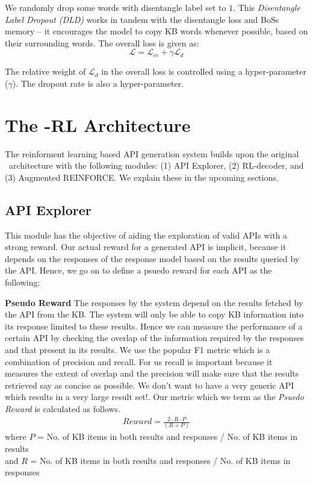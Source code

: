 We randomly drop some words with disentangle label set to $1$. This \textit{Disentangle Label Dropout (DLD)} works in tandem with the disentangle loss and {\sc BoSs} memory -- it encourages the model to copy KB words whenever possible, based on their surrounding words. The overall loss is given as:
\begin{equation}
\mathcal{L} = \mathcal{L}_{ce} + \gamma \mathcal{L}_{d}
\label{eqn:loss}
\end{equation}

The relative weight of $\mathcal{L}_{d}$ in the overall loss is controlled using a hyper-parameter ($\gamma$). The dropout rate is also a hyper-parameter.

\section{The \sys -RL Architecture}
The reinforment learning based API generation system builds upon the original \sys\ architecture with the following modules: (1) API Explorer, (2) RL-decoder, and (3) Augmented REINFORCE. We explain these in the upcoming sections.

\subsection{API Explorer}
This module has the objective of aiding the exploration of valid APIs with a strong reward. Our actual reward for a generated API is implicit, because it depends on the responses of the response model based on the results queried by the API. Hence, we go on to define a psuedo reward for each API as the following:

\noindent\textbf{Pseudo Reward}
\label{ssec:PsReward}
The responses by the system depend on the results fetched by the API from the KB. The system will only be able to copy KB information into its response limited to these results. Hence we can measure the performance of a certain API by checking the overlap of the information required by the responses and that present in its results. We use the popular F1 metric which is a combination of precision and recall. For us recall is important because it measures the extent of overlap and the precision will make sure that the results retrieved say as concise as possible. We don't want to have a very generic API which results in a very large result set!. Our metric which we term as the {\em Psuedo Reward} is calculated as follows.
\begin{gather}
Reward = \frac{2 \cdot R \cdot P}{(R + P)}
\end{gather}
where $P$ = No. of KB items in both results and responses / No. of KB items in results \\ and $R$ = No. of KB items in both results and responses / No. of KB items in responses

